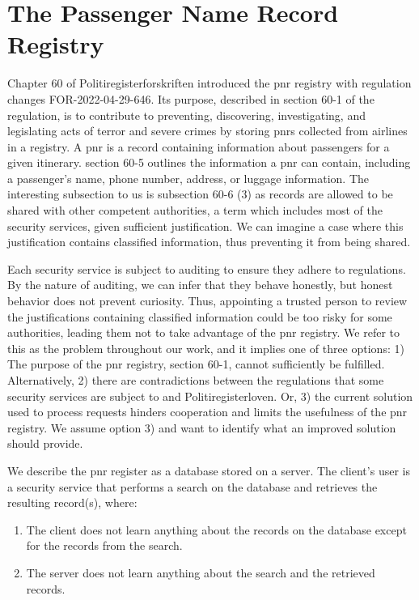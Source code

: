 \section{The Passenger Name Record Registry}
\label{sec:pnr}

Chapter 60 of Politiregisterforskriften introduced the \acrshort{pnr} registry with regulation changes FOR-2022-04-29-646. Its purpose, described in section 60-1 of the regulation, is to contribute to preventing, discovering, investigating, and legislating acts of terror and severe crimes by storing \acrshort{pnr}s  collected from airlines in a registry. A \acrshort{pnr} is a record containing information about passengers for a given itinerary. section 60-5  outlines the information a \acrshort{pnr} can contain, including a passenger's name, phone number, address, or luggage information. The interesting subsection to us is subsection 60-6 (3) as records are allowed to be shared with other competent authorities, a term which includes most of the security services, given sufficient justification. We can imagine a case where this justification contains classified information, thus preventing it from being shared.

Each security service is subject to auditing to ensure they adhere to regulations. By the nature of auditing, we can infer that they behave honestly, but honest behavior does not prevent curiosity. Thus, appointing a trusted person to review the justifications containing classified information could be too risky for some authorities, leading them not to take advantage of the \acrshort{pnr} registry. We refer to this as the problem throughout our work, and it implies one of three options: 1) The purpose of the \acrshort{pnr} registry, section 60-1, cannot sufficiently be fulfilled. Alternatively, 2) there are contradictions between the regulations that some security services are subject to and Politiregisterloven. Or, 3) the current solution used to process requests hinders cooperation and limits the usefulness of the \acrshort{pnr} registry. We assume option 3) and want to identify what an improved solution should provide. 

We describe the \acrshort{pnr} register as a database stored on a server. The client's user is a security service that performs a search on the database and retrieves the resulting record(s), where:

\begin{enumerate}
    \item The client does not learn anything about the records on the database except for the records from the search.
    \item The server does not learn anything about the search and the retrieved records.
\end{enumerate}

